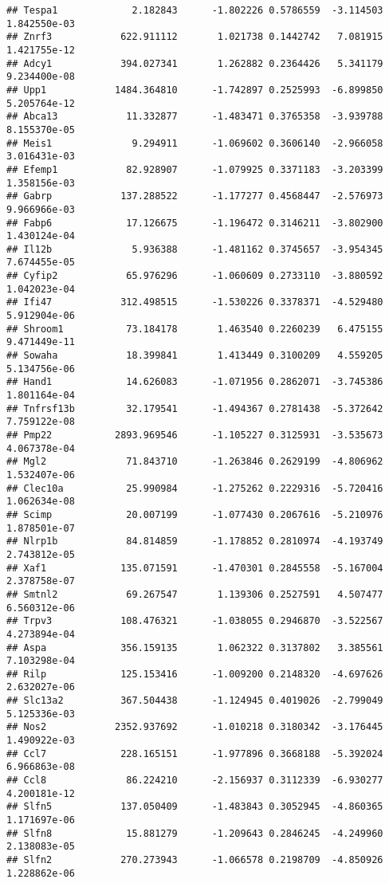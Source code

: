 \documentclass[
]{article}
\begin{document}
\begin{verbatim}
## Tespa1             2.182843      -1.802226 0.5786559  -3.114503 1.842550e-03
## Znrf3            622.911112       1.021738 0.1442742   7.081915 1.421755e-12
## Adcy1            394.027341       1.262882 0.2364426   5.341179 9.234400e-08
## Upp1            1484.364810      -1.742897 0.2525993  -6.899850 5.205764e-12
## Abca13            11.332877      -1.483471 0.3765358  -3.939788 8.155370e-05
## Meis1              9.294911      -1.069602 0.3606140  -2.966058 3.016431e-03
## Efemp1            82.928907      -1.079925 0.3371183  -3.203399 1.358156e-03
## Gabrp            137.288522      -1.177277 0.4568447  -2.576973 9.966966e-03
## Fabp6             17.126675      -1.196472 0.3146211  -3.802900 1.430124e-04
## Il12b              5.936388      -1.481162 0.3745657  -3.954345 7.674455e-05
## Cyfip2            65.976296      -1.060609 0.2733110  -3.880592 1.042023e-04
## Ifi47            312.498515      -1.530226 0.3378371  -4.529480 5.912904e-06
## Shroom1           73.184178       1.463540 0.2260239   6.475155 9.471449e-11
## Sowaha            18.399841       1.413449 0.3100209   4.559205 5.134756e-06
## Hand1             14.626083      -1.071956 0.2862071  -3.745386 1.801164e-04
## Tnfrsf13b         32.179541      -1.494367 0.2781438  -5.372642 7.759122e-08
## Pmp22           2893.969546      -1.105227 0.3125931  -3.535673 4.067378e-04
## Mgl2              71.843710      -1.263846 0.2629199  -4.806962 1.532407e-06
## Clec10a           25.990984      -1.275262 0.2229316  -5.720416 1.062634e-08
## Scimp             20.007199      -1.077430 0.2067616  -5.210976 1.878501e-07
## Nlrp1b            84.814859      -1.178852 0.2810974  -4.193749 2.743812e-05
## Xaf1             135.071591      -1.470301 0.2845558  -5.167004 2.378758e-07
## Smtnl2            69.267547       1.139306 0.2527591   4.507477 6.560312e-06
## Trpv3            108.476321      -1.038055 0.2946870  -3.522567 4.273894e-04
## Aspa             356.159135       1.062322 0.3137802   3.385561 7.103298e-04
## Rilp             125.153416      -1.009200 0.2148320  -4.697626 2.632027e-06
## Slc13a2          367.504438      -1.124945 0.4019026  -2.799049 5.125336e-03
## Nos2            2352.937692      -1.010218 0.3180342  -3.176445 1.490922e-03
## Ccl7             228.165151      -1.977896 0.3668188  -5.392024 6.966863e-08
## Ccl8              86.224210      -2.156937 0.3112339  -6.930277 4.200181e-12
## Slfn5            137.050409      -1.483843 0.3052945  -4.860365 1.171697e-06
## Slfn8             15.881279      -1.209643 0.2846245  -4.249960 2.138083e-05
## Slfn2            270.273943      -1.066578 0.2198709  -4.850926 1.228862e-06

\end{verbatim}
\end{document}
